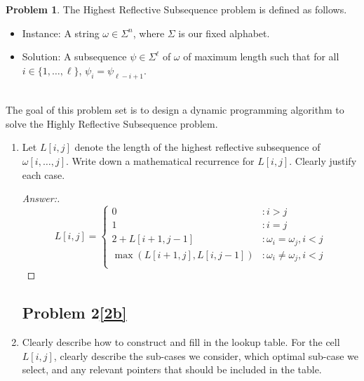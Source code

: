 \documentclass[11pt]{article}
\theoremstyle{definition}
\theoremstyle{definition}
\newtheorem{required}{Problem}
\theoremstyle{definition}
\begin{document}
\begin{required}
The \textsf{Highest Reflective Subsequence} problem is defined as follows.
\begin{itemize}
\item \textsf{Instance:} A string $\omega \in \Sigma^{n}$, where $\Sigma$ is our fixed alphabet.
\item \textsf{Solution:} A subsequence $\psi \in \Sigma^{\ell}$ of $\omega$ of maximum length such that for all $i \in \{1, \ldots, \ell\}$, $\psi_{i} = \psi_{\ell - i + 1}$.
\end{itemize}


\noindent \\ The goal of this problem set is to design a dynamic programming algorithm to solve the \textsf{Highly Reflective Subsequence} problem.

\begin{enumerate}[label=(\alph*)]
\subsection{Problem 2\ref{2a}}
\item \label{2a} Let $L[i, j]$ denote the length of the highest reflective subsequence of $\omega[i, \ldots, j]$. Write down a mathematical recurrence for $L[i, j]$. Clearly justify each case.

\begin{proof}[Answer:] \
\[
L[i,j] = \begin{cases} 
0 & : i > j \\
1 & : i = j \\
2 + L[i + 1, j - 1] & : \omega_i = \omega_j , i < j \\
\max(L[i + 1, j], L[i, j - 1]) & : \omega_i \neq \omega_j , i < j \\
\end{cases}
\]

\end{proof}



\newpage
\subsection{Problem 2\ref{2b}}
\item \label{2b} Clearly describe how to construct and fill in the lookup table. For the cell $L[i, j]$, clearly describe the sub-cases we consider, which optimal sub-case we select, and any relevant pointers that should be included in the table.


\end{enumerate}
\end{required}
\end{document}
